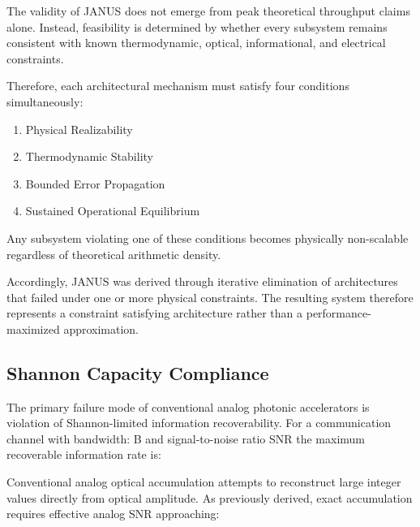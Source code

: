 \documentclass[journal]{IEEEtran}
\begin{document}
The validity of JANUS does not emerge from peak theoretical throughput claims alone. Instead, feasibility is determined by whether every subsystem remains consistent with known thermodynamic, optical, informational, and electrical constraints.

Therefore, each architectural mechanism must satisfy four conditions simultaneously:

\begin{enumerate}
\item Physical Realizability
\item Thermodynamic Stability
\item Bounded Error Propagation
\item Sustained Operational Equilibrium
\end{enumerate}

Any subsystem violating one of these conditions becomes physically non-scalable regardless of theoretical arithmetic density.

Accordingly, JANUS was derived through iterative elimination of architectures that failed under one or more physical constraints. The resulting system therefore represents a constraint satisfying architecture rather than a performance-maximized approximation.

\subsection{\textbf{Shannon Capacity Compliance}}

The primary failure mode of conventional analog photonic accelerators is violation of Shannon-limited information recoverability. For a communication channel with bandwidth: B and signal-to-noise ratio SNR the maximum recoverable information rate is:

\begin{center}
\end{center}

Conventional analog optical accumulation attempts to reconstruct large integer values directly from optical amplitude. As previously derived, exact accumulation requires effective analog SNR approaching:

\begin{center}
\end{center}

\begin{center}
\end{center}
\end{document}
